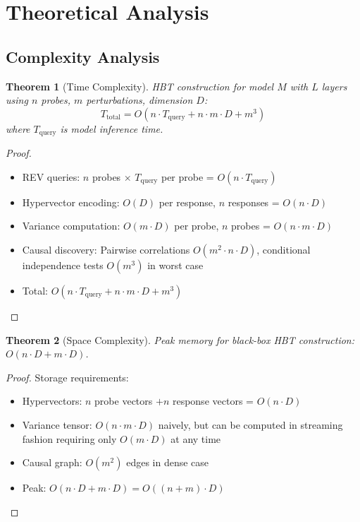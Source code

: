 \documentclass[11pt,a4paper]{article}
\newtheorem{theorem}{Theorem}
\begin{document}
\section{Theoretical Analysis}

\subsection{Complexity Analysis}

\begin{theorem}[Time Complexity]
HBT construction for model $M$ with $L$ layers using $n$ probes, $m$ perturbations, dimension $D$:
\begin{equation}
T_{\text{total}} = O(n \cdot T_{\text{query}} + n \cdot m \cdot D + m^3)
\end{equation}
where $T_{\text{query}}$ is model inference time.
\end{theorem}

\begin{proof}
\begin{itemize}
\item REV queries: $n$ probes $\times$ $T_{\text{query}}$ per probe = $O(n \cdot T_{\text{query}})$
\item Hypervector encoding: $O(D)$ per response, $n$ responses = $O(n \cdot D)$
\item Variance computation: $O(m \cdot D)$ per probe, $n$ probes = $O(n \cdot m \cdot D)$
\item Causal discovery: Pairwise correlations $O(m^2 \cdot n \cdot D)$, conditional independence tests $O(m^3)$ in worst case
\item Total: $O(n \cdot T_{\text{query}} + n \cdot m \cdot D + m^3)$
\end{itemize}
\end{proof}

\begin{theorem}[Space Complexity]
Peak memory for black-box HBT construction: $O(n \cdot D + m \cdot D)$.
\end{theorem}

\begin{proof}
Storage requirements:
\begin{itemize}
\item Hypervectors: $n$ probe vectors $+ n$ response vectors = $O(n \cdot D)$
\item Variance tensor: $O(n \cdot m \cdot D)$ naively, but can be computed in streaming fashion requiring only $O(m \cdot D)$ at any time
\item Causal graph: $O(m^2)$ edges in dense case
\item Peak: $O(n \cdot D + m \cdot D) = O((n+m) \cdot D)$
\end{itemize}
\end{proof}
\end{document}
